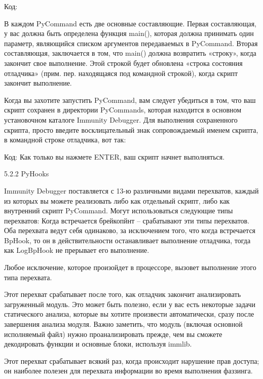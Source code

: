 \documentclass[12pt]{book}
\begin{document}
Код:


В каждом PyCommand есть две основные составляющие. Первая составляющая, у вас должна быть определена функция main(), которая должна принимать один параметр, являющийся списком аргументов передаваемых в PyCommand. Вторая составляющая, заключается в том, что main() должна возвратить «строку», когда закончит свое выполнение. Этой строкой будет обновлена «строка состояния отладчика» (прим. пер. находящаяся под командной строкой), когда скрипт закончит выполнение.

Когда вы захотите запустить PyCommand, вам следует убедиться в том, что ваш скрипт сохранен в директории PyCommands, которая находится в основном установочном каталоге Immunity Debugger. Для выполнения сохраненного скрипта, просто введите восклицательный знак сопровождаемый именем скрипта, в командной строке отладчика, вот так:

Код:
Как только вы нажмете ENTER, ваш скрипт начнет выполняться.

5.2.2 PyHooks

Immunity Debugger поставляется с 13-ю различными видами перехватов, каждый из которых вы можете реализовать либо как отдельный скрипт, либо как внутренний скрипт PyCommand. Могут использоваться следующие типы перехватов: 
Когда встречается брейкопйнт – срабатывают эти типы перехватов. Оба перехвата ведут себя одинаково, за исключением того, что когда встречается BpHook, то он в действительности останавливает выполнение отладчика, тогда как LogBpHook не прерывает его выполнение.

Любое исключение, которое произойдет в процессоре, вызовет выполнение этого типа перехвата.

Этот перехват срабатывает после того, как отладчик закончит анализировать загруженный модуль. Это может быть полезно, если у вас есть некоторые задачи статического анализа, которые вы хотите произвести автоматически, сразу после завершения анализа модуля. Важно заметить, что модуль (включая основной исполняемый файл) нужно проанализировать прежде, чем вы сможете декодировать функции и основные блоки, используя immlib.

Этот перехват срабатывает всякий раз, когда происходит нарушение прав доступа; он наиболее полезен для перехвата информации во время выполнения фаззинга. 
\end{document}
